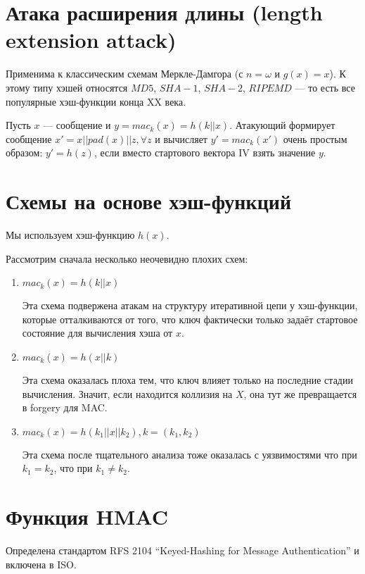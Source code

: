 \section{Атака расширения длины (length extension attack)}

Применима к классическим схемам Меркле-Дамгора (с $n=\omega$
и $g\left( x \right) = x$).
К этому типу хэшей относятся $MD5$, $SHA-1$, $SHA-2$, $RIPEMD$
--- то есть все популярные хэш-функции конца XX века.

Пусть $x$ --- сообщение и
$y=mac_k\left( x \right) = h\left( k || x \right)$.
Атакующий формирует сообщение
$x' = x || pad\left( x \right) || z, \forall z$
и вычисляет $y' = mac_k\left( x' \right)$ очень простым образом:
$y' = h\left( z \right)$, если вместо стартового вектора IV взять
значение $y$.

\section{Схемы на основе хэш-функций}

Мы используем хэш-функцию $h\left( x \right)$.

Рассмотрим сначала несколько неочевидно плохих схем:
\begin{enumerate}
  \item $mac_k\left( x \right) = h\left( k || x \right)$

    Эта схема подвержена атакам на структуру итеративной цепи у хэш-функции,
    которые отталкиваются от того, что ключ фактически только задаёт стартовое
    состояние для вычисления хэша от $x$.
  \item $mac_k\left( x \right) = h\left( x || k \right)$

    Эта схема оказалась плоха тем, что ключ влияет только на последние стадии
    вычисления. Значит, если находится коллизия на $X$, она тут же
    превращается в forgery для MAC.
  \item $mac_k\left( x \right) = h\left( k_1 || x || k_2 \right), k=\left( k_1, k_2 \right)$

    Эта схема после тщательного анализа тоже оказалась с уязвимостями
    что при $k_1 = k_2$, что при $k_1 \neq k_2$.
\end{enumerate}

\section{Функция HMAC}

Определена стандартом RFS 2104 ``Keyed-Hashing for Message Authentication''
и включена в ISO.

